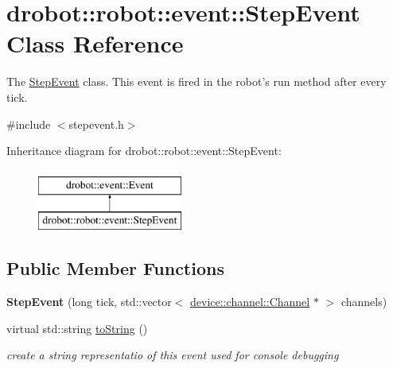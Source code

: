 \hypertarget{classdrobot_1_1robot_1_1event_1_1StepEvent}{\section{drobot\-:\-:robot\-:\-:event\-:\-:Step\-Event Class Reference}
\label{classdrobot_1_1robot_1_1event_1_1StepEvent}
}


The \hyperlink{classdrobot_1_1robot_1_1event_1_1StepEvent}{Step\-Event} class. This event is fired in the robot's run method after every tick.  




{\ttfamily \#include $<$stepevent.\-h$>$}

Inheritance diagram for drobot\-:\-:robot\-:\-:event\-:\-:Step\-Event\-:\begin{figure}[H]
\begin{center}
\leavevmode
\includegraphics[height=2.000000cm]{classdrobot_1_1robot_1_1event_1_1StepEvent}
\end{center}
\end{figure}
\subsection*{Public Member Functions}
\begin{DoxyCompactItemize}
\item 
\hypertarget{classdrobot_1_1robot_1_1event_1_1StepEvent_a5e69bc4f78a26d9840e703b62d276bd2}{{\bfseries Step\-Event} (long tick, std\-::vector$<$ \hyperlink{classdrobot_1_1device_1_1channel_1_1Channel}{device\-::channel\-::\-Channel} $\ast$ $>$ channels)}\label{classdrobot_1_1robot_1_1event_1_1StepEvent_a5e69bc4f78a26d9840e703b62d276bd2}

\item 
virtual std\-::string \hyperlink{classdrobot_1_1robot_1_1event_1_1StepEvent_a40504ba9d43d9db0efdd7a16551af2f3}{to\-String} ()
\begin{DoxyCompactList}\small\item\em create a string representatio of this event used for console debugging \end{DoxyCompactList}\end{DoxyCompactItemize}
